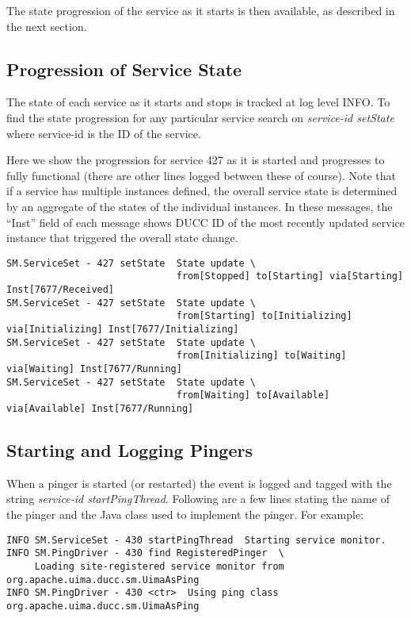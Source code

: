     The state progression of the service as it starts is then available, as described in the next section.


\subsection{Progression of Service State}

    The state of each service as it starts and stops is tracked at log level INFO.  To find the state progression
    for any particular service search on {\em service-id setState} where service-id is the ID of the service.
    
    Here we show the progression for service 427 as it is started and progresses to fully functional (there are
    other lines logged between these of course).  Note that if a service has multiple instances defined, the 
    overall service state is determined by an aggregate of the states of the individual instances.  In these
    messages, the ``Inst'' field of each message shows DUCC ID of the most recently updated  service instance 
    that triggered the overall state change.

\begin{verbatim}
SM.ServiceSet - 427 setState  State update \
                              from[Stopped] to[Starting] via[Starting] Inst[7677/Received]
SM.ServiceSet - 427 setState  State update \
                              from[Starting] to[Initializing] via[Initializing] Inst[7677/Initializing]
SM.ServiceSet - 427 setState  State update \
                              from[Initializing] to[Waiting] via[Waiting] Inst[7677/Running]
SM.ServiceSet - 427 setState  State update \
                              from[Waiting] to[Available] via[Available] Inst[7677/Running]
\end{verbatim}

\subsection{Starting and Logging Pingers}

    When a pinger is started (or restarted) the event is logged and tagged
    with the string {\em service-id startPingThread}.  Following are a few 
    lines stating the name of the pinger and the Java class used to
    implement the pinger.  For example:

\begin{verbatim}
INFO SM.ServiceSet - 430 startPingThread  Starting service monitor.
INFO SM.PingDriver - 430 find RegisteredPinger  \
     Loading site-registered service monitor from org.apache.uima.ducc.sm.UimaAsPing
INFO SM.PingDriver - 430 <ctr>  Using ping class org.apache.uima.ducc.sm.UimaAsPing
\end{verbatim}

